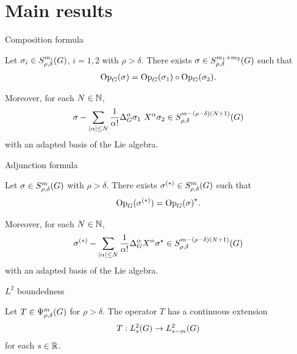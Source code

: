 \documentclass[handout]{beamer}
\begin{document}
\section{Main results}

\begin{frame}{Composition formula}
    \begin{theorem}
        Let $\sigma_i \in S^{m_i}_{\rho, \delta}(G)$, $i = 1, 2$ with $\rho > \delta$.
        There exists $\sigma \in S^{m_1 + m_2}_{\rho, \delta}(G)$ such that
        \begin{align*}
            \mathrm{Op}_{G}(\sigma) = \mathrm{Op}_{G}(\sigma_1) \circ \mathrm{Op}_{G}(\sigma_2).
        \end{align*}

        Moreover,
        for each $N \in \mathbb{N}$,
        \begin{align*}
            \sigma - \sum_{\abs \alpha \leq N} \frac 1 {\alpha!} \DifferenceOperatorOrder {\alpha} \sigma_1 \ \LeftDifferentialOperator {\alpha} \sigma_2 \in \SymbolClass {m - (\rho - \delta) (N + 1)} {\rho, \delta}
        \end{align*}
        with an adapted basis of the Lie algebra.
    \end{theorem}
\end{frame}

\begin{frame}{Adjunction formula}
    \begin{theorem}
        Let $\sigma \in S^{m}_{\rho, \delta}(G)$ with $\rho > \delta$.
        There exists $\sigma^{(*)} \in S^{m}_{\rho, \delta}(G)$ such that
        \begin{align*}
            \mathrm{Op}_{G}(\sigma^{(*)}) = {\mathrm{Op}_{G}(\sigma)}^\star.
        \end{align*}

        Moreover,
        for each $N \in \mathbb{N}$,
        \begin{align*}
            \sigma^{(*)} - \sum_{\abs \alpha \leq N} \frac 1 {\alpha!} \DifferenceOperatorOrder {\alpha} \LeftDifferentialOperator {\alpha} \adj \sigma \in \SymbolClass {m - (\rho - \delta) (N + 1)} {\rho, \delta}
        \end{align*}
        with an adapted basis of the Lie algebra.
    \end{theorem}
\end{frame}

\begin{frame}{$L^2$ boundedness}
    \begin{theorem}[$L^2$ boundedness]
        Let $T \in \Psi^{m}_{\rho, \delta}(G)$ for $\rho > \delta$.
        The operator $T$ has a continuous extension
        \begin{align*}
            T : L^2_{s}(G) \to L^2_{s - m}(G)
        \end{align*}
        for each $s \in \mathbb{R}$.
    \end{theorem}
\end{frame}
\end{document}
